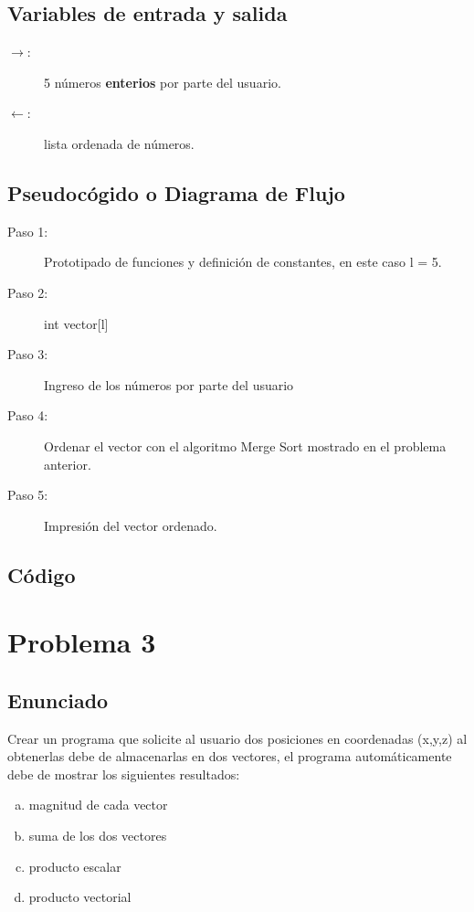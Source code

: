 \subsection{Variables de entrada y salida}
\begin{description}
	\item[$\rightarrow$: ] 5 números \textbf{enterios} por parte del usuario.
	\item[$\leftarrow$: ] lista ordenada de números. 
\end{description}

\subsection{Pseudocógido o Diagrama de Flujo}
\begin{description}
	\item[Paso 1: ] Prototipado de funciones y definición de constantes, en este caso l = 5.
	\item[Paso 2: ] int vector[l]
	\item[Paso 3: ] Ingreso de los números por parte del usuario
	\item[Paso 4: ] Ordenar el vector con el algoritmo Merge Sort mostrado en el problema anterior.
	\item[Paso 5: ] Impresión del vector ordenado.
\end{description}

\subsection{Código}

\section{Problema 3}
\subsection{Enunciado}
Crear un programa que solicite al usuario dos posiciones en coordenadas (x,y,z) al obtenerlas debe de
almacenarlas en dos vectores, el programa automáticamente debe de mostrar los siguientes resultados:
\begin{multicols}{2}
	\begin{enumerate}[a)]
		\item magnitud de cada vector
		\item suma de los dos vectores
		\item producto escalar
		\item producto vectorial
	\end{enumerate}
\end{multicols}


